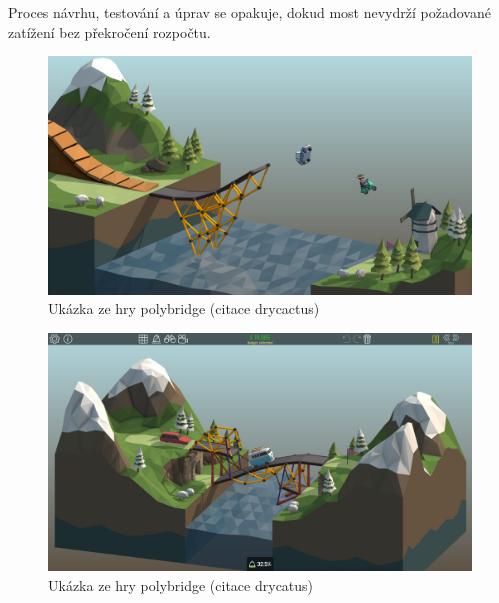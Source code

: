 Proces návrhu, testování a úprav se opakuje, dokud most nevydrží požadované zatížení bez překročení rozpočtu.


\begin{figure}[p]\centering
\includegraphics[width=140mm]{img/poly_screen_1.jpg}
\caption{Ukázka ze hry polybridge (citace drycactus)}
\label{poly-fig:1}

\end{figure}

\begin{figure}[p]\centering
\includegraphics[width=140mm]{img/poly_screen_2.jpg}
\caption{Ukázka ze hry polybridge (citace drycatus)}
\label{poly-fig:2}
\end{figure}



